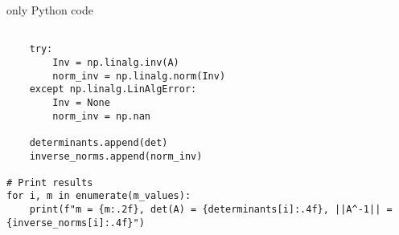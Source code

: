 \documentclass{beamer}
\begin{document}
\begin{frame}[fragile]{only Python code }
\begin{lstlisting}

    try:
        Inv = np.linalg.inv(A)
        norm_inv = np.linalg.norm(Inv)
    except np.linalg.LinAlgError:
        Inv = None
        norm_inv = np.nan

    determinants.append(det)
    inverse_norms.append(norm_inv)

# Print results
for i, m in enumerate(m_values):
    print(f"m = {m:.2f}, det(A) = {determinants[i]:.4f}, ||A^-1|| = {inverse_norms[i]:.4f}")

 \end{lstlisting}
\end{frame}
\end{document}
